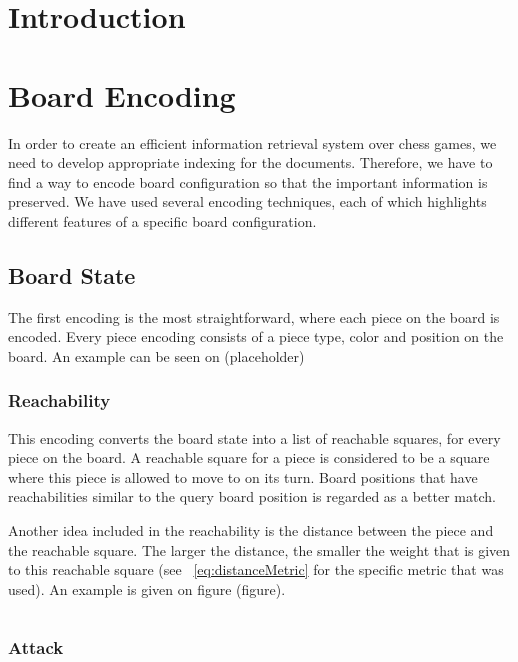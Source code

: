 \documentclass[11pt]{article}
\begin{document}
    \section{Introduction}


    \section{Board Encoding}

    In order to create an efficient information retrieval system over chess games, we need to develop appropriate indexing for the documents. Therefore, we have to find a way to encode board configuration so that the important information is preserved. We have used several encoding techniques, each of which highlights different features of a specific board configuration.

    \subsection{Board State}

    The first encoding is the most straightforward, where each piece on the board is encoded. Every piece encoding consists of a piece type, color and position on the board. An example can be seen on (placeholder)

    \subsubsection{Reachability}

    This encoding converts the board state into a list of reachable squares, for every piece on the board. A reachable square for a piece is considered to be a square where this piece is allowed to move to on its turn. Board positions that have reachabilities similar to the query board position is regarded as a better match.

    Another idea included in the reachability is the distance between the piece and the reachable square. The larger the distance, the smaller the weight that is given to this reachable square (see ~\eqref{eq:distanceMetric} for the specific metric that was used). An example is given on figure (figure).

    \begin{equation}
        \label{eq:distanceMetric}
    \end{equation}

    \subsubsection{Attack}
\end{document}
